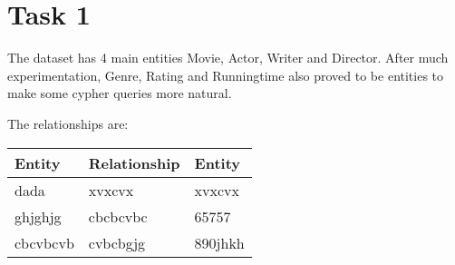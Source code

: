 \chapter{Task 1}

The dataset has 4 main entities Movie, Actor, Writer and Director. After much experimentation, Genre, Rating and Runningtime also proved to be entities to make some cypher queries more natural.\medskip

The relationships are:

\begin{table}[h]
\begin{tabular}{|l|l|l|}
\hline
\rowcolor[HTML]{3166FF} 
{\color[HTML]{FFFFFF} \textbf{Entity}} & {\color[HTML]{FFFFFF} \textbf{Relationship}} & {\color[HTML]{FFFFFF} \textbf{Entity}} \\ \hline
dada                                   & xvxcvx                                       & xvxcvx                                 \\ \hline
ghjghjg                                & cbcbcvbc                                     & 65757                                  \\ \hline
cbcvbcvb                               & cvbcbgjg                                     & 890jhkh                                \\ \hline
\end{tabular}
\end{table}